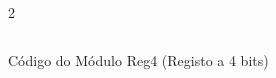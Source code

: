 \begin{figure}[H]
    \centering   
    \begin{tcolorbox}  
        \begin{multicols}{2} 
        \fontsize{9pt}{9pt}\selectfont\inputminted[obeytabs=true,tabsize=4,xleftmargin=20pt,linenos,breaklines]{VHDL}{VHDL/files/Reg4.vhd}    
        \end{multicols}
    \end{tcolorbox}   
    \caption{Código do Módulo Reg4 (Registo a 4 bits)}
\end{figure}